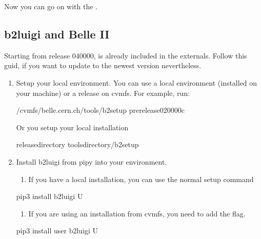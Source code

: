 \documentclass[letterpaper,10pt,english]{sphinxmanual}
\begin{document}
Now you can go on with the {\hyperref[\detokenize{usage/quickstart:quick-start-label}]{}}.


\subsection{b2luigi and Belle II}
\label{\detokenize{usage/installation:b2luigi-and-belle-ii}}
Starting from release 04\sphinxhyphen{}00\sphinxhyphen{}00,  is already included in the externals.
Follow this guid, if you want to update to the newest version nevertheless.
\begin{enumerate}
%
\item {} 
Setup your local environment. You can use a local environment (installed on your machine) or a release on cvmfs.
For example, run:

\begin{sphinxVerbatim}[commandchars=\\\{\}]
 /cvmfs/belle.cern.ch/tools/b2setup prerelease\PYGZhy{}02\PYGZhy{}00\PYGZhy{}00c
\end{sphinxVerbatim}

Or you setup your local installation

\begin{sphinxVerbatim}[commandchars=\\\{\}]
 release\PYGZhy{}directory
 tools\PYGZhy{}directory/b2setup
\end{sphinxVerbatim}

\item {} 
Install b2luigi from pipy into your environment.
\begin{enumerate}
%
\item {} 
If you have a local installation, you can use the normal setup command

\end{enumerate}

\begin{sphinxVerbatim}[commandchars=\\\{\}]
pip3 install b2luigi \PYGZhy{}U
\end{sphinxVerbatim}
\begin{enumerate}
%
\setcounter{enumii}{1}
\item {} 
If you are using an installation from cvmfs, you need to add the  flag.

\end{enumerate}

\begin{sphinxVerbatim}[commandchars=\\\{\}]
pip3 install \PYGZhy{}\PYGZhy{}user b2luigi \PYGZhy{}U
\end{sphinxVerbatim}

\end{enumerate}
\end{document}
